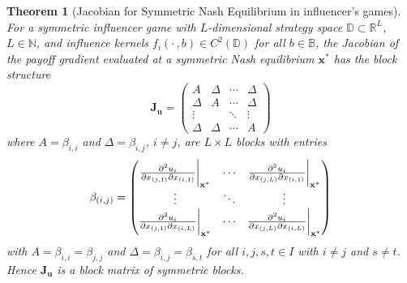 \documentclass{article}
\newtheorem{theorem}{Theorem}[section]
\begin{document}
            \begin{theorem}[Jacobian for Symmetric Nash Equilibrium in influencer's games]\label{thm:SI_Jacobian}
                For a symmetric influencer game with $L$-dimensional strategy space $\mathbb{D} \subset \mathbb{R}^L$, $L \in \mathbb{N}$, and influence kernels $f_i(\cdot\,,b) \in C^2(\mathbb{D})$ for all $b \in \mathbb{B}$, the Jacobian of the payoff gradient evaluated at a symmetric Nash equilibrium $\mathbf{x}^*$ has the block structure
                \begin{equation}\label{eq:paper_jacobian_general}
                    \mathbf{J}_{\mathbf{u}} = \begin{pmatrix}
                        A & \Delta & \cdots & \Delta \\
                        \Delta & A & \cdots & \Delta \\
                        \vdots & & \ddots & \vdots \\
                        \Delta & \Delta & \cdots & A
                    \end{pmatrix}
                \end{equation}
                where $A = \beta_{i,i}$ and $\Delta = \beta_{i,j}$, $i \neq j$, are $L\times L$ blocks with entries
                \begin{align}
                    \beta_{(i,j)} = \begin{pmatrix}
                        \pdv[2]{u_i}{x_{(j,1)}}{x_{(i,1)}}\bigg|_{\mathbf{x}^*} & 
                        \cdots & 
                        \pdv[2]{u_i}{x_{(j,L)}}{x_{(i,1)}}\bigg|_{\mathbf{x}^*} \\
                        \vdots & \ddots & \vdots \\
                        \pdv[2]{u_i}{x_{(j,1)}}{x_{(i,L)}}\bigg|_{\mathbf{x}^*} & 
                        \cdots & 
                        \pdv[2]{u_i}{x_{(j,L)}}{x_{(i,L)}}\bigg|_{\mathbf{x}^*}
                    \end{pmatrix}
                \end{align}
                with $A = \beta_{i,i} = \beta_{j,j}$ and $\Delta = \beta_{i,j} = \beta_{s,t}$ for all $i,j,s,t \in I$ with $i \neq j$ and $s \neq t$. Hence $\mathbf{J}_{\mathbf{u}}$ is a block matrix of symmetric blocks.
            \end{theorem}
\end{document}
